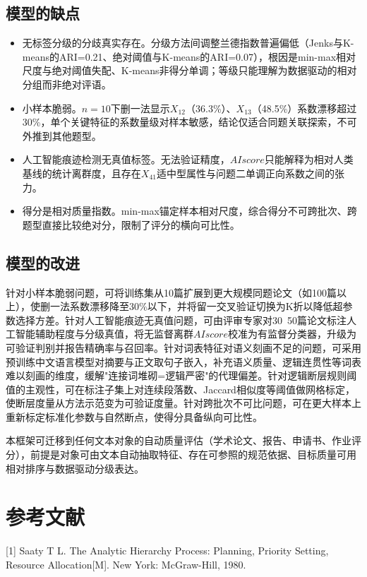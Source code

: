 \documentclass[withoutpreface]{cumcmthesis}
\begin{document}
\subsection{模型的缺点}
\begin{itemize}
  \item 无标签分级的分歧真实存在。分级方法间调整兰德指数普遍偏低（Jenks与K-means的ARI=0.21、绝对阈值与K-means的ARI=0.07），根因是min-max相对尺度与绝对阈值失配、K-means非得分单调；等级只能理解为数据驱动的相对分组而非绝对评语。
  \item 小样本脆弱。$n=10$下删一法显示$X_{12}$（36.3\%）、$X_{13}$（48.5\%）系数漂移超过30\%，单个关键特征的系数量级对样本敏感，结论仅适合同题关联探索，不可外推到其他题型。
  \item 人工智能痕迹检测无真值标签。无法验证精度，$AIscore$只能解释为相对人类基线的统计离群度，且存在$X_{41}$适中型属性与问题二单调正向系数之间的张力。
  \item 得分是相对质量指数。min-max锚定样本相对尺度，综合得分不可跨批次、跨题型直接比较绝对分，限制了评分的横向可比性。
\end{itemize}
\subsection{模型的改进}
针对小样本脆弱问题，可将训练集从10篇扩展到更大规模同题论文（如100篇以上），使删一法系数漂移降至30\%以下，并将留一交叉验证切换为K折以降低超参数选择方差。针对人工智能痕迹无真值问题，可由评审专家对30~50篇论文标注人工智能辅助程度与分级真值，将无监督离群$AIscore$校准为有监督分类器，升级为可验证判别并报告精确率与召回率。针对词表特征对语义刻画不足的问题，可采用预训练中文语言模型对摘要与正文取句子嵌入，补充语义质量、逻辑连贯性等词表难以刻画的维度，缓解"连接词堆砌=逻辑严密"的代理偏差。针对逻辑断层规则阈值的主观性，可在标注子集上对连续段落数、Jaccard相似度等阈值做网格标定，使断层度量从方法示范变为可验证度量。针对跨批次不可比问题，可在更大样本上重新标定标准化参数与自然断点，使得分具备纵向可比性。

本框架可迁移到任何文本对象的自动质量评估（学术论文、报告、申请书、作业评分），前提是对象可由文本自动抽取特征、存在可参照的规范依据、目标质量可用相对排序与数据驱动分级表达。

\section{参考文献}
[1] Saaty T L. The Analytic Hierarchy Process: Planning, Priority Setting, Resource Allocation[M]. New York: McGraw-Hill, 1980.
\end{document}
